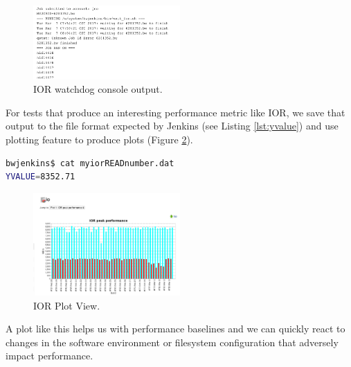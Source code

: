 \documentclass[AMA]{WileyNJD-v1}
\begin{document}
\begin{figure}[H]
\centering
\includegraphics[width=0.5\textwidth]{IOR-watchdog-out}
\caption{ IOR watchdog console output.}
\label{fig:IOR-watchdog-out}
\end{figure}
For tests that produce an interesting performance metric like IOR, we save that output to the file format expected by Jenkins (see Listing \ref{lst:yvalue}) and use plotting feature to produce plots (Figure \ref{fig:IOR-plot}). 
\begin{lstlisting}[frame=tb,captionpos=t,language=bash,caption={sample YVALUE output file}, label=lst:yvalue]
bwjenkins$ cat myiorREADnumber.dat 
YVALUE=8352.71
\end{lstlisting}
\begin{figure}[H]
\centering
\includegraphics[width=0.5\textwidth]{IOR-plot}
\caption{IOR Plot View.}
\label{fig:IOR-plot}
\end{figure}
A plot like this helps us with performance baselines and we can quickly react to changes in the software environment or filesystem configuration that adversely impact performance.
\end{document}
